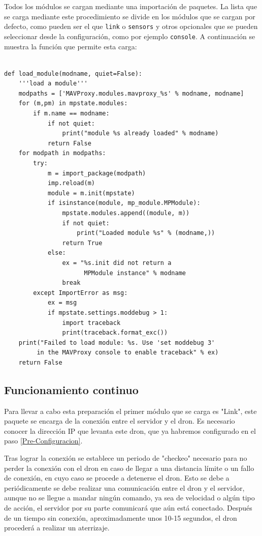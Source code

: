 \bigskip
\bigskip
\bigskip
Todos los módulos se cargan mediante una importación de paquetes. La lista que se carga mediante este procedimiento se divide en los módulos que se cargan por defecto, como pueden ser el que \texttt{link} o \texttt{sensors} y otros opcionales que se pueden seleccionar desde la configuración, como por ejemplo \texttt{console}. A continuación se muestra la función que permite esta carga:
\begin{lstlisting}[frame=single]

def load_module(modname, quiet=False):
    '''load a module'''
    modpaths = ['MAVProxy.modules.mavproxy_%s' % modname, modname]
    for (m,pm) in mpstate.modules:
        if m.name == modname:
            if not quiet:
                print("module %s already loaded" % modname)
            return False
    for modpath in modpaths:
        try:
            m = import_package(modpath)
            imp.reload(m)
            module = m.init(mpstate)
            if isinstance(module, mp_module.MPModule):
                mpstate.modules.append((module, m))
                if not quiet:
                    print("Loaded module %s" % (modname,))
                return True
            else:
                ex = "%s.init did not return a 
                      MPModule instance" % modname
                break
        except ImportError as msg:
            ex = msg
            if mpstate.settings.moddebug > 1:
                import traceback
                print(traceback.format_exc())
    print("Failed to load module: %s. Use 'set moddebug 3' 
         in the MAVProxy console to enable traceback" % ex)
    return False
\end{lstlisting}


\subsection{Funcionamiento continuo}

Para llevar a cabo esta preparación el primer módulo que se carga es "Link", este paquete se encarga de la conexión entre el servidor y el dron. Es necesario conocer la dirección IP que levanta este dron, que ya habremos configurado en el paso \ref{Pre-Configuracion}.

Tras lograr la conexión se establece un periodo de "checkeo" necesario para no perder la conexión con el dron en caso de llegar a una distancia límite o un fallo de conexión, en cuyo caso se procede a detenerse el dron. Esto se debe a periódicamente se debe realizar una comunicación entre el dron y el servidor, aunque no se llegue a mandar ningún comando, ya sea de velocidad o algún tipo de acción, el servidor por su parte comunicará que aún está conectado. Después de un tiempo sin conexión, aproximadamente unos 10-15 segundos, el dron procederá a realizar un aterrizaje. 

